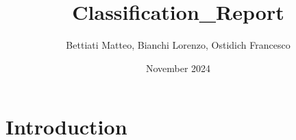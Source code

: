 \documentclass{article}
\title{Classification\_Report}
\author{Bettiati Matteo, Bianchi Lorenzo, Ostidich Francesco}
\date{November 2024}
\begin{document}
\maketitle

\section{Introduction}
\end{document}

